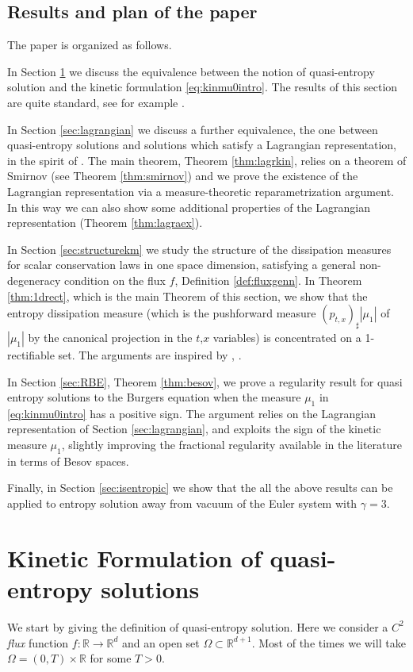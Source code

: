 \documentclass[11pt, twoside, reqno]{amsart}
\theoremstyle{definition}
\theoremstyle{remark}
\numberwithin{equation}{section}
\begin{document}
\subsection{Results and plan of the paper} The  paper is organized as follows.

In Section \ref{sec:KFFES} we discuss the equivalence between the notion of quasi-entropy solution and the kinetic formulation \eqref{eq:kinmu0intro}. The results of this section are quite standard, see for example \cite{DOW03}.

In Section \ref{sec:lagrangian} we discuss a further equivalence, the one between quasi-entropy solutions and solutions which satisfy a Lagrangian representation, in the spirit of \cite{BBM_multid, marconi_structure}.  The main theorem, Theorem \ref{thm:lagrkin}, relies on a theorem of Smirnov \cite{smirnov_currents} (see Theorem \ref{thm:smirnov}) and we prove the existence of the Lagrangian representation via a measure-theoretic reparametrization argument. In this way we can also show some additional properties of the Lagrangian representation (Theorem \ref{thm:lagraex}).

In Section \ref{sec:structurekm} we study the structure of the dissipation measures for scalar conservation laws in one space dimension, satisfying a general non-degeneracy condition on the flux $f$, Definition \ref{def:fluxgenn}. In Theorem \ref{thm:1drect}, which is the main Theorem of this section, we show that the entropy dissipation measure (which is the pushforward measure $(p_{t,x})_\sharp |\mu_1|$ of $|\mu_1|$ by the canonical projection in the $t$,$x$ variables) is concentrated on a 1-rectifiable set. The arguments are inspired by \cite{marconi_burgers}, \cite{Mar23}.

In Section \ref{sec:RBE}, Theorem \ref{thm:besov}, we prove a regularity result for quasi entropy solutions to the Burgers equation when the measure $\mu_1$ in \eqref{eq:kinmu0intro} has a positive sign. The argument relies on the Lagrangian representation of Section \ref{sec:lagrangian}, and exploits the sign of the kinetic measure $\mu_1$, slightly improving the fractional regularity available in the literature \cite{GP13} in terms of Besov spaces.

Finally, in Section \ref{sec:isentropic} we show that the all the above results can be applied to entropy solution away from vacuum of the Euler system with $\gamma = 3$.



\section{Kinetic Formulation of quasi-entropy solutions}\label{sec:KFFES}
We start by giving the definition of quasi-entropy solution. Here we consider a $C^2$ \textit{flux} function $f  : \mathbb R \to \mathbb R^d$ and an open set $\Omega \subset \mathbb R^{d+1}$. Most of the times we will take $\Omega = (0,T) \times \mathbb R$ for some $T >0$.
\end{document}
